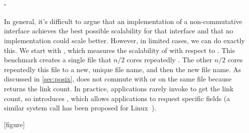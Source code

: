 
\paragraph{.} In general, it's difficult to argue that an
implementation of a
non-commutative interface achieves the best possible scalability for
that interface and that no implementation could scale better.  However,
in limited cases, we can do exactly this.  We start with ,
which measures the scalability of  with respect to
.  This benchmark creates a single file that $n/2$ cores
repeatedly . The other $n/2$ cores repeatedly
 this file to a new, unique file name, and then 
the new file name.  As discussed in \cref{sec:posix},  does not
commute with  or  on the same file because
 returns the link count.  In practice,
applications rarely invoke  to get the link count, so \sys
introduces , which allows applications to request specific
fields (a similar system call has been proposed for
Linux~\cite{linux:xstat}).


[figure]
\renewcommand{\themysubfigure}{\thefigure(\alph{mysubfigure})}

\begin{figure*}
  \centering
  
  \label{fig:linkbench}
  \hspace{-.05in}
  
  \hspace{-0.2in}
  \label{fig:fdbench}
  \addtocounter{figure}{-1}
\end{figure*}


